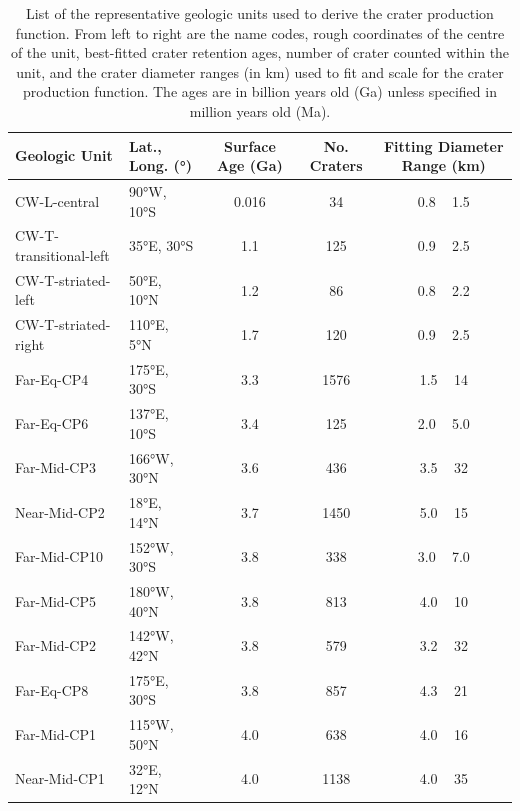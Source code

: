 \documentclass[preprint,12pt,3p,times,authoryear]{elsarticle}
\begin{document}
\begin{table}[t]%
\centering%
\begin{tabular}{llccc}
\hline
\textbf{Geologic Unit} & \textbf{Lat., Long. (°)} & \textbf{Surface Age (Ga)} & \textbf{No. Craters} & \textbf{Fitting Diameter Range (km)} \\
\hline
CW-L-central           & 90°W, 10°S      & 0.016 & 34    & 0.8 ~ 1.5 \\
CW-T-transitional-left & 35°E, 30°S      & 1.1   & 125   & 0.9 ~ 2.5 \\
CW-T-striated-left     & 50°E, 10°N      & 1.2   & 86    & 0.8 ~ 2.2 \\
CW-T-striated-right    & 110°E, 5°N      & 1.7   & 120   & 0.9 ~ 2.5 \\
Far-Eq-CP4             & 175°E, 30°S     & 3.3   & 1576  & 1.5 ~ 14  \\
Far-Eq-CP6             & 137°E, 10°S     & 3.4   & 125   & 2.0 ~ 5.0 \\
Far-Mid-CP3            & 166°W, 30°N     & 3.6   & 436   & 3.5 ~ 32  \\
Near-Mid-CP2           & 18°E, 14°N      & 3.7   & 1450  & 5.0 ~ 15  \\
Far-Mid-CP10           & 152°W, 30°S     & 3.8   & 338   & 3.0 ~ 7.0 \\
Far-Mid-CP5            & 180°W, 40°N     & 3.8   & 813   & 4.0 ~ 10  \\
Far-Mid-CP2            & 142°W, 42°N     & 3.8   & 579   & 3.2 ~ 32  \\
Far-Eq-CP8             & 175°E, 30°S     & 3.8   & 857   & 4.3 ~ 21  \\
Far-Mid-CP1            & 115°W, 50°N     & 4.0   & 638   & 4.0 ~ 16  \\
Near-Mid-CP1           & 32°E, 12°N      & 4.0   & 1138  & 4.0 ~ 35  \\
\hline
\end{tabular}
\caption{List of the representative geologic units used to derive the crater production function. From left to right are the name codes, rough coordinates of the centre of the unit, best-fitted crater retention ages, number of crater counted within the unit, and the crater diameter ranges (in km) used to fit and scale for the crater production function. The ages are in billion years old (Ga) unless specified in million years old (Ma).}
\label{tab:craters}
\end{table}
\end{document}

